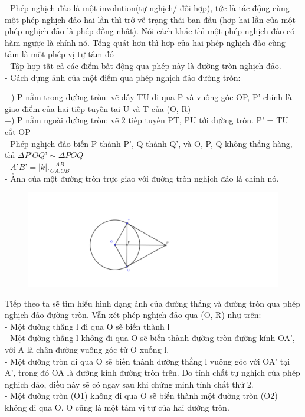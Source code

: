- Phép nghịch đảo là một involution(tự nghịch/ đối hợp), tức là tác động cùng một phép nghịch đảo hai lần thì trở về trạng thái ban đầu (hợp hai lần của một phép nghịch đảo là phép đồng nhất). Nói cách khác thì một phép nghịch đảo có hàm ngược là chính nó.
Tổng quát hơn thì hợp của hai phép nghịch đảo cùng tâm là một phép vị tự tâm đó \\
- Tập hợp tất cả các điểm bất động qua phép này là đường tròn nghịch đảo. \\
- Cách dựng ảnh của một điểm qua phép nghịch đảo đường tròn:

    +) P nằm trong đường tròn: vẽ dây TU đi qua P và vuông góc OP, P’ chính là giao điểm của hai tiếp tuyến tại U và T của (O, R)\\
    +) P nằm ngoài đường tròn: vẽ 2 tiếp tuyến PT, PU tới đường tròn. P’ = TU cắt OP \\
- Phép nghịch đảo biến P thành P’, Q thành Q’, và O, P, Q không thẳng hàng, thì $\Delta  P’OQ’ \sim  \Delta POQ$ \\
- $A’B’ = |k|. \frac{AB}{OA.OB}$ \\
- Ảnh của một đường tròn trực giao với đường tròn nghịch đảo là chính nó.

\begin{figure}[ht]
\includegraphics[width=\textwidth]{Dung_anh_phep_nghich_dao.pdf}
\end{figure}

Tiếp theo ta sẽ tìm hiểu hình dạng ảnh của đường thẳng và đường tròn qua phép nghịch đảo đường tròn. Vẫn xét phép nghịch đảo qua (O, R) như trên: \\
- Một đường thẳng l đi qua O sẽ biến thành l \\
- Một đường thẳng l không đi qua O sẽ biến thành đường tròn đường kính OA’, với A là chân đường vuông góc từ O xuống l. \\ 
- Một đường tròn đi qua O sẽ biến thành đường thẳng l vuông góc với OA’ tại A’, trong đó OA là đường kính đường tròn trên. Do tính chất tự nghịch của phép nghịch đảo, điều này sẽ có ngay sau khi chứng minh tính chất thứ 2. \\
- Một đường tròn (O1) không đi qua O sẽ biến thành một đường tròn (O2) không đi qua O. O cũng là một tâm vị tự của hai đường tròn. 

